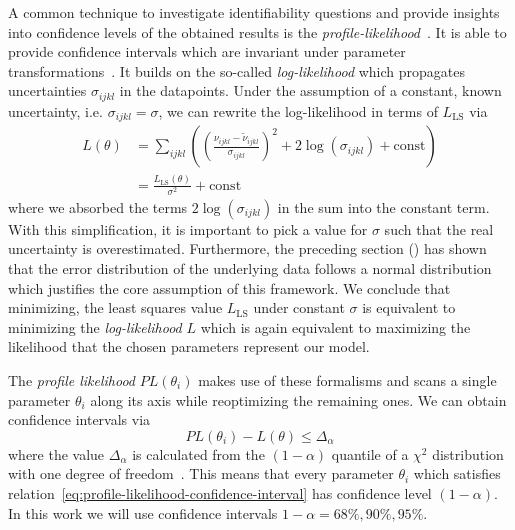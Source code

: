 A common technique to investigate identifiability questions and provide insights into confidence
levels of the obtained results is the
\textit{profile-likelihood}~\cite{Murphy2000,Kreutz2013,Tnsing2023}.
It is able to provide confidence intervals which are invariant under parameter
transformations~\cite{Meeker1995}.
It builds on the so-called \textit{log-likelihood} which propagates uncertainties
$\sigma_{ijkl}$ in
the datapoints.
Under the assumption of a constant, known uncertainty, i.e. $\sigma_{ijkl}=\sigma$,
we can rewrite
the log-likelihood in terms of $L_\text{LS}$ via
\begin{align}
    L(\theta) &=
    \sum\limits_{ijkl}\left(\left(\frac{\nu_{ijkl}-\tilde{\nu}_{ijkl}}{\sigma_{ijkl}}\right)^2
        + 2 \log(\sigma_{ijkl})
    +\text{const}\right)\\
    &= \frac{L_\text{LS}(\theta)}{\sigma^2} + \text{const}
\end{align}
where we absorbed the terms $2\log(\sigma_{ijkl})$ in the sum into the constant term.
With this simplification, it is important to pick a value for $\sigma$ such that the real
uncertainty is overestimated.
Furthermore, the preceding section ()
has shown that
the error distribution of the underlying data follows a normal distribution which
justifies the core
assumption of this framework.
We conclude that minimizing, the least squares value $L_\text{LS}$ under constant $\sigma$ is
equivalent to minimizing the \textit{log-likelihood} $L$ which is again equivalent to
maximizing the
likelihood that the chosen parameters represent our model.

The \textit{profile likelihood} $PL(\theta_i)$ makes use of these formalisms and scans a single
parameter $\theta_i$ along its axis while reoptimizing the remaining ones.
We can obtain confidence intervals via
\begin{equation}
    PL(\theta_i) - L(\theta) \leq \Delta_\alpha
    \label{eq:profile-likelihood-confidence-interval}
\end{equation}
where the value $\Delta_\alpha$ is calculated from the $(1-\alpha)$ quantile of a $\chi^2$
distribution with one degree of freedom~\cite{Tnsing2023}.
This means that every parameter $\theta_i$ which satisfies
relation~\eqref{eq:profile-likelihood-confidence-interval} has confidence level $(1-\alpha)$.
In this work we will use confidence intervals $1-\alpha=68\%,90\%,95\%$.

